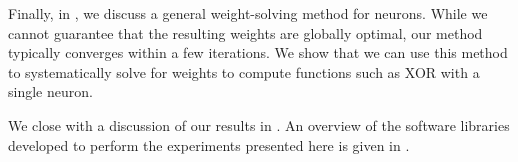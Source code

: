 Finally, in , we discuss a general weight-solving method for \nlif neurons.
While we cannot guarantee that the resulting weights are globally optimal, our method typically converges within a few iterations.
We show that we can use this method to systematically solve for weights to compute functions such as XOR with a single neuron.

We close with a discussion of our results in .
An overview of the software libraries developed to perform the experiments presented here is given in .
